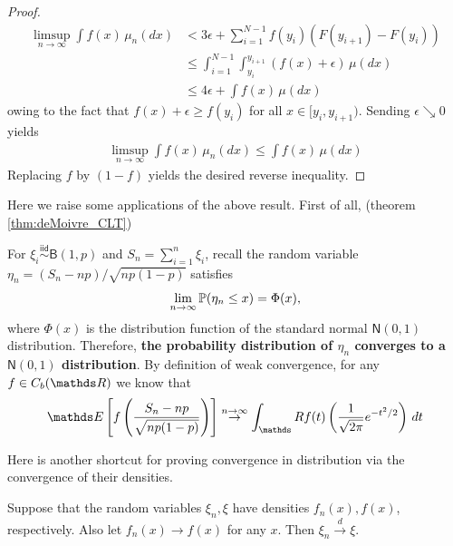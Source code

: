 \begin{proof}
\begin{align*}
    \limsup_{n\to\infty} \int f(x) \, \mu_n(dx) &< 3\epsilon + \sum_{i=1}^{N-1} f(y_i)(F(y_{i+1}) - F(y_{i})) \\
    &\leq \int_{i=1}^{N-1} \int_{y_i}^{y_{i+1}} (f(x)+\epsilon) \, \mu(dx) \\
    &\leq 4\epsilon + \int f(x) \, \mu(dx)
\end{align*}
owing to the fact that $f(x) + \epsilon \geq f(y_i)$ for all $x \in [y_i, y_{i+1})$. Sending $\epsilon \searrow 0$ yields
\begin{align*}
    \limsup_{n\to\infty} \int f(x) \, \mu_n(dx) \leq \int f(x) \, \mu(dx)
\end{align*}
Replacing $f$ by $(1-f)$ yields the desired reverse inequality.
\end{proof}

Here we raise some applications of the above result. First of all, (theorem \ref{thm:deMoivre_CLT})
\begin{example} \label{ex:deMoivre_CLT_conv_dist}
For $\xi_i \overset{\mathsf{iid}}{\sim} \mathsf{B}(1,p)$ and $S_n = \sum_{i=1}^n \xi_i$, recall the random variable $\eta_n = (S_n-np)/\sqrt{np(1-p)}$ satisfies
\begin{equation*}
    \lim_{n \rightarrow \infty} \mathbb{P} (\eta_n \le x) = \Phi (x),
\end{equation*}
where $\Phi(x)$ is the distribution function of the standard normal $\mathsf{N}(0,1)$ distribution. Therefore, \textbf{the probability distribution of $\eta_n$ converges to a $\mathsf{N}(0,1)$ distribution}. By definition of weak convergence, for any $f \in C_b(\R)$ we know that
\begin{equation}
\E\sqbracket{f\bracket{\frac{S_n-np}{\sqrt{np(1-p)}}}} \overset{n\to\infty}{\to} \int_\R f(t) \bracket{\frac{1}{\sqrt{2\pi}} e^{-t^2/2}} \, dt
\end{equation}
\end{example}

Here is another shortcut for proving convergence in distribution via the convergence of their densities.

\begin{corollary}
Suppose that the random variables $\xi_n, \xi$ have densities $f_n(x), f(x)$, respectively. Also let $f_n(x) \to f(x)$ for any $x$. Then $\xi_n \xrightarrow{d} \xi$.
\end{corollary}

